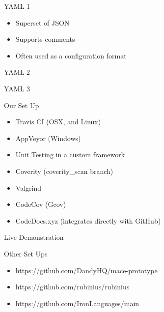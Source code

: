 \documentclass{beamer}
\begin{document}
\begin{frame}{YAML 1}
	\begin{itemize}
		\item Superset of JSON
		\item Supports comments
		\item Often used as a configuration format
	\end{itemize}
\end{frame}


\begin{frame}{YAML 2}
	\lstII
\end{frame}


\begin{frame}{YAML 3}
	\lstIII
\end{frame}

\begin{frame}{Our Set Up}
	\begin{itemize}
		\item Travis CI (OSX, and Linux)
		\item AppVeyor (Windows)
		\item Unit Testing in a custom framework
		\item Coverity (coverity\_scan branch)
		\item Valgrind
		\item CodeCov (Gcov)
		\item CodeDocs.xyz (integrates directly with GitHub)
	\end{itemize}
\end{frame}

\begin{frame}{Live Demonstration}
\end{frame}

\begin{frame}{Other Set Ups}
	\begin{itemize}
		\item https://github.com/DandyHQ/mace-prototype
		\item https://github.com/rubinius/rubinius
		\item https://github.com/IronLanguages/main
	\end{itemize}
\end{frame}
\end{document}
